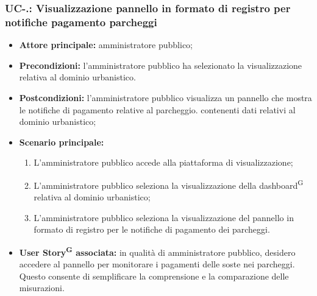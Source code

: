 \documentclass[8pt]{article}
\newcommand{\glossterm}[1]{#1\textsuperscript{G}} %
\begin{document}
\subsubsection*{UC-\theuc .\speconenumber: Visualizzazione pannello in formato di registro per notifiche pagamento parcheggi}
\begin{itemize}
    \item \textbf{Attore principale:} amministratore pubblico;
    \item \textbf{Precondizioni:} l'amministratore pubblico ha selezionato la visualizzazione
        relativa al dominio urbanistico.
    \item \textbf{Postcondizioni:} l'amministratore pubblico visualizza un pannello che mostra le notifiche di pagamento relative al parcheggio.
        contenenti dati relativi al dominio urbanistico;
    \item \textbf{Scenario principale:} 
    \begin{enumerate}
    \item L'amministratore pubblico accede alla piattaforma di visualizzazione;
    \item L'amministratore pubblico seleziona la visualizzazione della \glossterm{dashboard} relativa al dominio urbanistico;
    \item L'amministratore pubblico seleziona la visualizzazione del pannello in formato di registro per le notifiche di pagamento dei parcheggi.
    \end{enumerate}
    \item \textbf{\glossterm{User Story} associata:} in qualità di amministratore pubblico, desidero accedere al pannello per monitorare i pagamenti delle soste nei parcheggi. Questo consente di semplificare la comprensione e la comparazione delle misurazioni.
\end{itemize}
\end{document}
